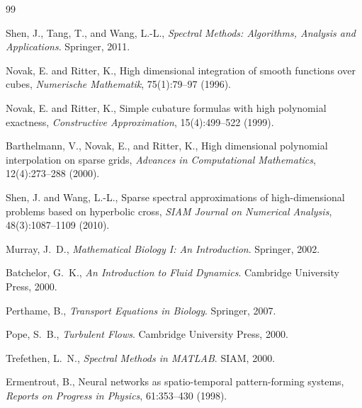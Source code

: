\newpage




\begin{thebibliography}{99}

Shen, J., Tang, T., and Wang, L.-L.,
\textit{Spectral Methods: Algorithms, Analysis and Applications}.
Springer, 2011.

Novak, E. and Ritter, K.,
High dimensional integration of smooth functions over cubes,
\textit{Numerische Mathematik}, 75(1):79--97 (1996).

Novak, E. and Ritter, K.,
Simple cubature formulas with high polynomial exactness,
\textit{Constructive Approximation}, 15(4):499--522 (1999).

Barthelmann, V., Novak, E., and Ritter, K.,
High dimensional polynomial interpolation on sparse grids,
\textit{Advances in Computational Mathematics}, 12(4):273--288 (2000).

Shen, J. and Wang, L.-L.,
Sparse spectral approximations of high-dimensional problems based on hyperbolic cross,
\textit{SIAM Journal on Numerical Analysis}, 48(3):1087--1109 (2010).

Murray, J.~D.,
\textit{Mathematical Biology I: An Introduction}.
Springer, 2002.

Batchelor, G.~K.,
\textit{An Introduction to Fluid Dynamics}.
Cambridge University Press, 2000.

Perthame, B.,
\textit{Transport Equations in Biology}.
Springer, 2007.

Pope, S.~B.,
\textit{Turbulent Flows}.
Cambridge University Press, 2000.

Trefethen, L.~N.,
\textit{Spectral Methods in MATLAB}.
SIAM, 2000.

Ermentrout, B.,
Neural networks as spatio-temporal pattern-forming systems,
\textit{Reports on Progress in Physics}, 61:353--430 (1998).


\end{thebibliography}
